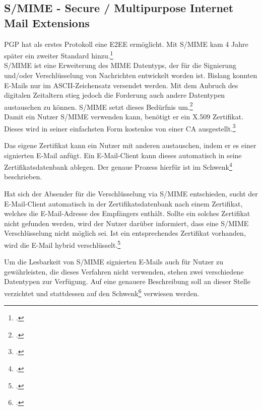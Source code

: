 \documentclass  [paper=a4,
				fontsize=12pt,
				listof=totoc,
				bibliography=totoc
				]{scrreprt}
\begin{document}
	
			\subsection{S/MIME - Secure / Multipurpose Internet Mail Extensions}
			
				\ac{PGP} hat als erstes Protokoll eine \ac{E2EE} ermöglicht. Mit \ac{S/MIME} kam 4 Jahre später ein zweiter Standard hinzu.\footcite[Vgl.][]{Duevel}
				\medskip\\	
				\ac{S/MIME} ist eine Erweiterung des MIME Datentyps, der für die Signierung und/oder Verschlüsselung von Nachrichten entwickelt worden ist.
				Bislang konnten E-Mails nur im ASCII-Zeichensatz versendet werden. Mit dem Anbruch des digitalen Zeitaltern stieg jedoch die Forderung auch andere Datentypen austauschen zu können. \ac{S/MIME} setzt dieses Bedürfnis um.\footcite[Vgl.][S. 57-60]{Schwenk}
				\medskip\\
				Damit ein Nutzer \ac{S/MIME} verwenden kann, benötigt er ein X.509 Zertifikat. Dieses wird in seiner einfachsten Form kostenlos von einer \ac{CA} ausgestellt.\footcite[Vgl.][]{Duevel}
				
				Das eigene Zertifikat kann ein Nutzer mit anderen austauschen, indem er es einer signierten E-Mail anfügt. Ein E-Mail-Client kann dieses automatisch in seine Zertifikatsdatenbank ablegen. Der genaue Prozess hierfür ist im Schwenk\footcite[Vgl.][S. 65 ff.]{Schwenk} beschrieben.
				\medskip
														
				Hat sich der Absender für die Verschlüsselung via \ac{S/MIME} entschieden, sucht der E-Mail-Client automatisch in der Zertifikatsdatenbank nach einem Zertifikat, welches die E-Mail-Adresse des Empfängers enthält. Sollte ein solches Zertifikat nicht gefunden werden, wird der Nutzer darüber informiert, dass eine \ac{S/MIME} Verschlüsselung nicht möglich sei. Ist ein entsprechendes Zertifikat vorhanden, wird die E-Mail hybrid verschlüsselt.\footcite[Vgl.][S. 65]{Schwenk}
				
				
				Um die Lesbarkeit von \ac{S/MIME} signierten E-Mails auch für Nutzer zu gewährleisten, die dieses Verfahren nicht verwenden, stehen zwei verschiedene Datentypen zur Verfügung. Auf eine genauere Beschreibung soll an dieser Stelle verzichtet und stattdessen auf den Schwenk\footcite[Vgl.][S. 65]{Schwenk} verwiesen werden.
				\medskip
\end{document}
